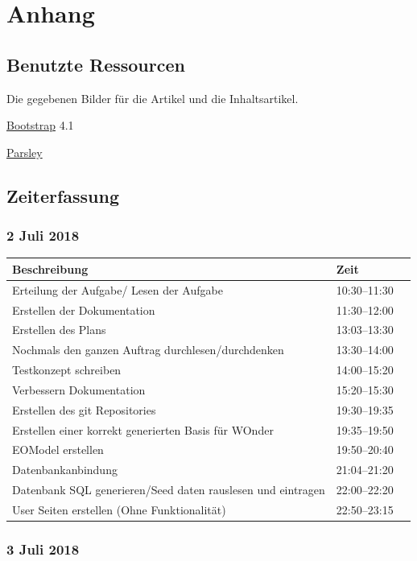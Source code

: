 \documentclass[a4paper, 11pt]{article}
\begin{document}
\section{Anhang}

\subsection{Benutzte Ressourcen}

Die gegebenen Bilder für die Artikel und die Inhaltsartikel.

\href{https://getbootstrap.com/docs/4.1/getting-started/introduction/}{Bootstrap} 4.1

\href{http://parsleyjs.org/doc/index.html/}{Parsley}

\subsection{Zeiterfassung}

\subsubsection{2 Juli 2018}

\begin{tabular}{llr}
\toprule
Beschreibung & Zeit \\
\midrule
Erteilung der Aufgabe/ Lesen der Aufgabe & 10:30--11:30 \\
Erstellen der Dokumentation & 11:30--12:00 \\
Erstellen des Plans & 13:03--13:30 \\
Nochmals den ganzen Auftrag durchlesen/durchdenken & 13:30--14:00 \\
Testkonzept schreiben & 14:00--15:20 \\
Verbessern Dokumentation & 15:20--15:30 \\
Erstellen des git Repositories & 19:30--19:35 \\
Erstellen einer korrekt generierten Basis  für WOnder & 19:35--19:50 \\
EOModel erstellen & 19:50--20:40 \\
Datenbankanbindung & 21:04--21:20 \\
Datenbank SQL generieren/Seed daten rauslesen und eintragen & 22:00--22:20 \\
User Seiten erstellen (Ohne Funktionalität) & 22:50--23:15 \\
\bottomrule
\end{tabular}

\subsubsection{3 Juli 2018}
\end{document}
